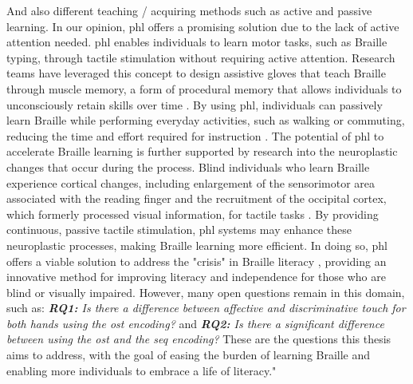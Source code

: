 And also different teaching / acquiring methods such as active and passive learning. In our opinion, \gls{phl} offers a promising solution due to the lack of active attention needed. \Gls{phl} enables individuals to learn motor tasks, such as Braille typing, through tactile stimulation without requiring active attention. Research teams have leveraged this concept to design assistive gloves that teach Braille through muscle memory, a form of procedural memory that allows individuals to unconsciously retain skills over time \cite{Yang2017, Seim2015}. By using \gls{phl}, individuals can passively learn Braille while performing everyday activities, such as walking or commuting, reducing the time and effort required for instruction \cite{Yang2017}.
The potential of \gls{phl} to accelerate Braille learning is further supported by research into the neuroplastic changes that occur during the process. Blind individuals who learn Braille experience cortical changes, including enlargement of the sensorimotor area associated with the reading finger and the recruitment of the occipital cortex, which formerly processed visual information, for tactile tasks \cite{Hamilton1998a}. By providing continuous, passive tactile stimulation, \gls{phl} systems may enhance these neuroplastic processes, making Braille learning more efficient. In doing so, \gls{phl} offers a viable solution to address the "crisis" in Braille literacy \cite{Seim2014a}, providing an innovative method for improving literacy and independence for those who are blind or visually impaired.
However, many open questions remain in this domain, such as: \textit{\textbf{RQ1:} Is there a difference between affective and discriminative touch for both hands using the \gls{ost} encoding?} and \textit{\textbf{RQ2:} Is there a significant difference between using the \gls{ost} and the \gls{seq} encoding?} These are the questions this thesis aims to address, with the goal of easing the burden of learning Braille and enabling more individuals to embrace a life of literacy."


